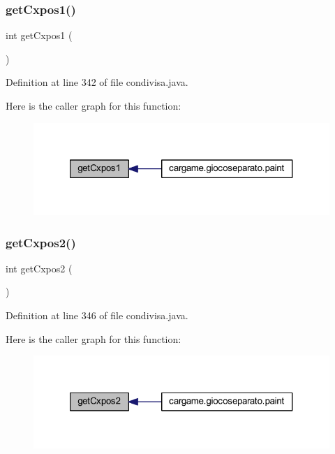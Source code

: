 \subsubsection{\texorpdfstring{get\+Cxpos1()}{getCxpos1()}}
{\footnotesize\ttfamily int get\+Cxpos1 (\begin{DoxyParamCaption}{ }\end{DoxyParamCaption})}



Definition at line 342 of file condivisa.\+java.

Here is the caller graph for this function\+:
\nopagebreak
\begin{figure}[H]
\begin{center}
\leavevmode
\includegraphics[width=321pt]{classcargame_1_1condivisa_a27fca0bd2f18175eab0edbca75a34788_icgraph}
\end{center}
\end{figure}
\mbox{\label{classcargame_1_1condivisa_a6344ddec07fd3cb38fd06dea41f8889b}} 
\subsubsection{\texorpdfstring{get\+Cxpos2()}{getCxpos2()}}
{\footnotesize\ttfamily int get\+Cxpos2 (\begin{DoxyParamCaption}{ }\end{DoxyParamCaption})}



Definition at line 346 of file condivisa.\+java.

Here is the caller graph for this function\+:
\nopagebreak
\begin{figure}[H]
\begin{center}
\leavevmode
\includegraphics[width=321pt]{classcargame_1_1condivisa_a6344ddec07fd3cb38fd06dea41f8889b_icgraph}
\end{center}
\end{figure}
\mbox{\label{classcargame_1_1condivisa_a4043cc22dca0beb331b9092cd575990b}} 
